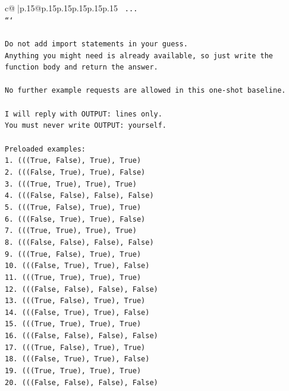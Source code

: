 \documentclass{article}
\begin{document}
{\begin{supertabular}{c@{$\;$}|p{.15\linewidth}@{}p{.15\linewidth}p{.15\linewidth}p{.15\linewidth}p{.15\linewidth}p{.15\linewidth}}
{{{\texttt{    ...} \\
\texttt{```} \\
\\ 
\texttt{Do not add import statements in your guess.} \\
\texttt{Anything you might need is already available, so just write the function body and return the answer.} \\
\\ 
\texttt{No further example requests are allowed in this one{-}shot baseline.} \\
\\ 
\texttt{I will reply with OUTPUT: lines only.} \\
\texttt{You must never write OUTPUT: yourself.} \\
\\ 
\texttt{Preloaded examples:} \\
\texttt{1. (((True, False), True), True)} \\
\texttt{2. (((False, True), True), False)} \\
\texttt{3. (((True, True), True), True)} \\
\texttt{4. (((False, False), False), False)} \\
\texttt{5. (((True, False), True), True)} \\
\texttt{6. (((False, True), True), False)} \\
\texttt{7. (((True, True), True), True)} \\
\texttt{8. (((False, False), False), False)} \\
\texttt{9. (((True, False), True), True)} \\
\texttt{10. (((False, True), True), False)} \\
\texttt{11. (((True, True), True), True)} \\
\texttt{12. (((False, False), False), False)} \\
\texttt{13. (((True, False), True), True)} \\
\texttt{14. (((False, True), True), False)} \\
\texttt{15. (((True, True), True), True)} \\
\texttt{16. (((False, False), False), False)} \\
\texttt{17. (((True, False), True), True)} \\
\texttt{18. (((False, True), True), False)} \\
\texttt{19. (((True, True), True), True)} \\
\texttt{20. (((False, False), False), False)} \\
}}}
\end{supertabular}}
\end{document}
